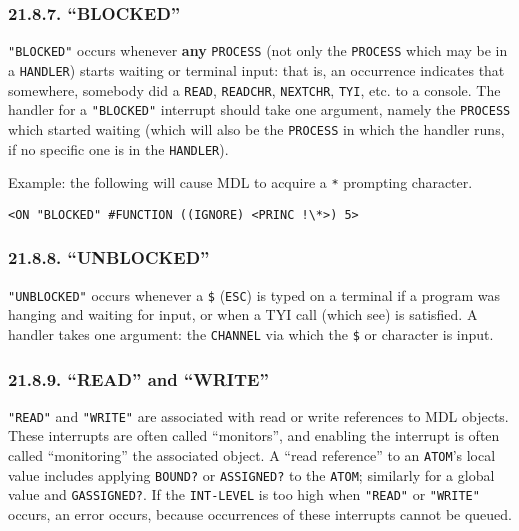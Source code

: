 \documentclass[a4paper,]{article}
\begin{document}
\subsubsection{\texorpdfstring{21.8.7. ``BLOCKED''}{21.8.7. BLOCKED}}\label{blocked}

\texttt{"BLOCKED"}  occurs whenever \textbf{any} \texttt{PROCESS} (not only the
\texttt{PROCESS} which may be in a \texttt{HANDLER}) starts waiting or terminal input: that is, an occurrence indicates
that somewhere, somebody did a \texttt{READ}, \texttt{READCHR},
\texttt{NEXTCHR}, \texttt{TYI}, etc. to a console. The handler for a
\texttt{"BLOCKED"} interrupt should take one argument, namely the \texttt{PROCESS} which started waiting (which will also
be the \texttt{PROCESS} in which the handler runs, if no specific one is in the \texttt{HANDLER}).

Example: the following will cause MDL to acquire a \texttt{*} prompting character.

\begin{verbatim}
<ON "BLOCKED" #FUNCTION ((IGNORE) <PRINC !\*>) 5>
\end{verbatim}

\subsubsection{\texorpdfstring{21.8.8. ``UNBLOCKED''}{21.8.8. UNBLOCKED}}\label{unblocked}

\texttt{"UNBLOCKED"}  occurs whenever a \texttt{\$} \index{\texttt{\$}} (\texttt{ESC})
is typed on a terminal if a program was hanging and waiting for input, or when a TYI call (which see)
is satisfied. A handler takes one argument: the \texttt{CHANNEL} via which the \texttt{\$} or character is input.

\subsubsection{\texorpdfstring{21.8.9. ``READ'' and ``WRITE''}{21.8.9. READ and WRITE}}\label{read-and-write}

\texttt{"READ"}  and \texttt{"WRITE"}  are associated with
read or write references to MDL objects. These interrupts are often called ``monitors'', and enabling the interrupt is
often called ``monitoring'' the associated object. A ``read reference'' to an \texttt{ATOM}'s local value includes applying
\texttt{BOUND?} or \texttt{ASSIGNED?} to the \texttt{ATOM}; similarly for
a global value and \texttt{GASSIGNED?}. If the \texttt{INT-LEVEL} is too high when
\texttt{"READ"} or \texttt{"WRITE"} occurs, an error occurs, because occurrences of these interrupts cannot be queued.
\end{document}
